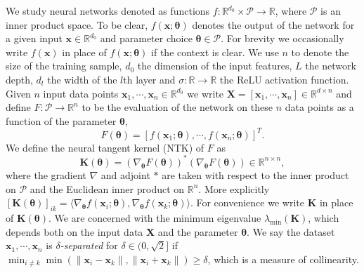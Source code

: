 \documentclass{article}
\theoremstyle{definition}
\newcommand*{\R}{\mathbb{R}}
\newcommand{\mc}{\mathcal}
\def\vtheta{{\bm{\theta}}}
\def\vx{{\bm{x}}}
\def\mK{{\bm{K}}}
\def\mX{{\bm{X}}}
\begin{document}
We study neural networks denoted as functions $f: \R^{d_0} \times \mc{P} \rightarrow \R$, where $\mc{P}$ is an inner product space. To be clear, $f(\vx; \vtheta)$ denotes the output of the network for a given input $\vx \in \R^{d_0}$ and parameter choice $\vtheta \in \mc{P}$. For brevity we occasionally write $f(\vx)$ in place of $f(\vx; \vtheta)$ if the context is clear. We use $n$ to denote the size of the training sample, $d_0$ the dimension of the input features, $L$ the network depth, $d_l$ the width of the $l$th layer and $\sigma: \R \rightarrow \R$ the ReLU activation function. Given $n$ input data points $\vx_1, \cdots, \vx_n \in \R^{d_0}$ we write $\mX = [\vx_1, \cdots, \vx_n] \in \R^{d \times n}$ and define $F: \mc{P} \to \R^n$ to be the evaluation of the network on these $n$ data points as a function of the parameter $\bm{\theta}$, 
$$
F(\bm{\theta}) = [f(\vx_1; \vtheta ), \cdots, f(\vx_n;\vtheta )]^T.
$$
We define the neural tangent kernel (NTK) of $F$ as
\begin{equation} 
\label{eq:NTK-def}
\mK(\vtheta) = (\nabla_{\vtheta} F(\vtheta ))^*(\nabla_{\vtheta} F(\vtheta )) \in \R^{n \times n} , 
\end{equation}
where the gradient $\nabla$ and adjoint $*$ are taken with respect to the inner product on $\mc{P}$ and the Euclidean inner product on $\R^n$. More explicitly $[\mK(\vtheta)]_{ik} = \langle \nabla_{\vtheta} f(\vx_i; \vtheta), \nabla_{\vtheta}f(\vx_k; \vtheta) \rangle$.
For convenience we write $\mK$ in place of $\mK(\vtheta)$. We are concerned with the minimum eigenvalue $\lambda_{\min}(\mK)$, which depends both on the input data $\mX$ and the parameter $\vtheta$. 
We say the dataset $\vx_1, \cdots, \vx_n$ is \emph{${\delta}$-separated} for $\delta \in (0,\sqrt{2}]$ if $\min_{i\neq k} \min(\|\vx_i - \vx_k\|, \|\vx_i + \vx_k\|) \geq \delta$, which is a measure of collinearity. 
\end{document}
